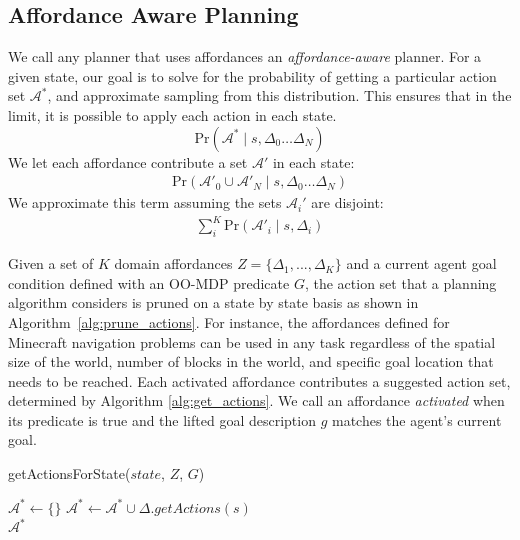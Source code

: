 \documentclass[conference]{IEEEtran}
\begin{document}
\subsection{Affordance Aware Planning}
We call any planner that
uses affordances an {\it affordance-aware} planner. For a given state, 
our goal is to solve for the probability of getting a particular action set $\mathcal{A}^*$, and approximate sampling
from this distribution. This ensures that in the limit, it is possible to apply each action in each state.
\begin{equation}
\text{Pr}(\mathcal{A}^* \mid s, \Delta_0 \dots \Delta_N)
\end{equation}
We let each affordance contribute a set $\mathcal{A}'$ in each state:
\begin{align}
\text{Pr}(\mathcal{A}'_0 \cup \mathcal{A}'_N \mid s, \Delta_0 \dots \Delta_N)
\end{align}
We approximate this term assuming the sets $\mathcal{A}_i'$ are disjoint:
\begin{align}
\sum_i^K \text{Pr}(\mathcal{A}'_i \mid s, \Delta_i)
\end{align}

Given a set of $K$ domain affordances $Z = \{\Delta_1, ..., \Delta_K\}$ and a current 
agent goal condition defined with an OO-MDP predicate $G$, the action set that a 
planning algorithm considers is pruned on a state by state basis as shown in 
Algorithm~\ref{alg:prune_actions}. For instance, the affordances defined for Minecraft 
navigation problems can be used in any task regardless of the spatial size of the world, 
number of blocks in the world, and specific goal location that needs to be reached. Each 
activated affordance contributes a suggested action set, determined by Algorithm \ref{alg:get_actions}. 
We call an affordance {\it activated} when its predicate is true and the lifted goal description $g$ matches the agent's current goal.

\begin{algorithm}
  \caption{getActionsForState($state$, $Z$, $G$)}
  \begin{algorithmic}[1]
    \State $\mathcal{A}^* \leftarrow \{\}$
    \State $\mathcal{A}^* \leftarrow \mathcal{A}^* \cup \Delta.getActions(s)$
    \EndIf
    \EndFor \\
    \Return $\mathcal{A}^*$
  \end{algorithmic}
  \label{alg:prune_actions}
\end{algorithm}
\end{document}
